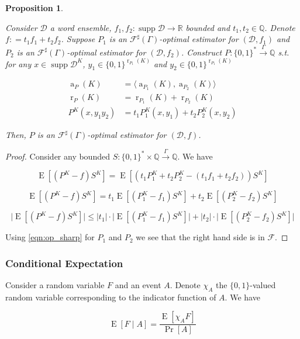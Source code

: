 \documentclass[11pt]{article}
\numberwithin{equation}{section}
\theoremstyle{definition}
\theoremstyle{plain}
\newtheorem{proposition}{Proposition}[section]
\newcommand{\Bool}{\{0,1\}}
\newcommand{\Words}{{\Bool^*}}
\newcommand{\WordsLen}[1]{{\Bool^{#1}}}
\DeclareMathOperator{\Supp}{supp}
\DeclareMathOperator{\Prb}{Pr}
\DeclareMathOperator{\E}{E}
\DeclareMathOperator{\R}{r}
\DeclareMathOperator{\A}{a}
\newcommand{\Rats}{\mathbb{Q}}
\newcommand{\Reals}{\mathbb{R}}
\newcommand{\Abs}[1]{\lvert #1 \rvert}
\newcommand{\Chev}[1]{\langle #1 \rangle}
\newcommand{\Dist}{\mathcal{D}}
\newcommand{\Fall}{\mathcal{F}}
\newcommand{\ESG}{\Fall^\sharp(\Gamma)}
\newcommand{\Scheme}{\xrightarrow{\Gamma}}
\begin{document}
\begin{proposition}
\label{prp:linearity}

Consider $\Dist$ a word ensemble, $f_1,f_2: \Supp \Dist \rightarrow \Reals$ bounded and $t_1,t_2 \in \Rats$. Denote $f: = t_1 f_1 + t_2 f_2$. Suppose $P_1$ is an $\ESG$-optimal estimator for $(\Dist,f_1)$ and $P_2$ is an $\ESG$-optimal estimator for $(\Dist,f_2)$. Construct $P: \Words \Scheme \Rats$ s.t. for any ${x \in \Supp \Dist^{K}}$, ${y_1 \in \WordsLen{\R_{P_1}(K)}}$ and $y_2 \in \WordsLen{\R_{P_1}(K)}$

\begin{align}
\A_P(K) &= \Chev{\A_{P_1}(K),\A_{P_2}(K)} \\
\R_P(K) &= \R_{P_1}(K) + \R_{P_2}(K) \\
P^{K}(x,y_1 y_2) &= t_1 P_1^{K}(x,y_1) + t_2 P_2^{K}(x, y_2)
\end{align}

Then, $P$ is an $\ESG$-optimal estimator for $(\Dist, f)$.

\end{proposition}

\begin{proof}

Consider any bounded $S: \Words \times \Rats \Scheme \Rats$. We have

$$\E[(P^{K} - f)S^{K}] = \E[(t_1 P_1^{K} + t_2 P_2^{K} - (t_1 f_1 + t_2 f_2))S^{K}]$$

$$\E[(P^{K} - f)S^{K}] = t_1 \E[(P_1^{K} - f_1)S^{K}] + t_2 \E[(P_2^{K} - f_2)S^{K}]$$

$$\Abs{\E[(P^{K} - f)S^{K}]} \leq \Abs{t_1} \cdot \Abs{\E[(P_1^{K} - f_1)S^{K}]} + \Abs{t_2} \cdot \Abs{\E[(P_2^{K} - f_2)S^{K}]}$$

Using \ref{eqn:op_sharp} for $P_1$ and $P_2$ we see that the right hand side is in $\Fall$.
\end{proof}

\subsubsection{Conditional Expectation}

Consider a random variable $F$ and an event $A$. Denote $\chi_A$ the $\Bool$-valued random variable corresponding to the indicator function of $A$. We have

\begin{equation}
\label{eqn:cond_ev}
\E[F \mid A] = \frac{\E[\chi_A F]}{\Prb[A]}
\end{equation}
\end{document}
